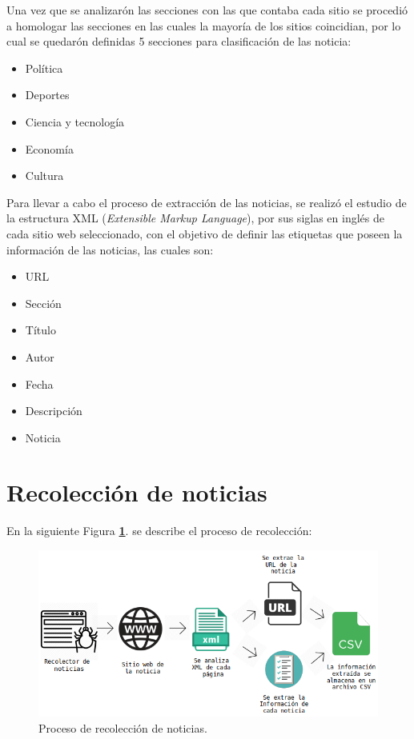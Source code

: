 Una vez que se analizarón las secciones con las que contaba cada sitio se procedió a homologar las secciones en las cuales la mayoría de los sitios coincidian, por lo cual se quedarón definidas 5 secciones para clasificación de las noticia:

\begin{itemize}
    \item Política
    \item Deportes
    \item Ciencia y tecnología
    \item Economía
    \item Cultura
\end{itemize}

Para llevar a cabo el proceso de extracción de las noticias, se realizó el estudio 
de la estructura XML (\textit{Extensible Markup Language}), por sus siglas en inglés de cada sitio web seleccionado, con 
el objetivo de definir las etiquetas que poseen la información de las noticias, las cuales son:

\begin{itemize}
  \item URL
  \item Sección
  \item Título
  \item Autor
  \item Fecha
  \item Descripción
  \item Noticia
\end{itemize} 

\section{Recolección de noticias}
En la siguiente Figura \textbf{\ref{fig:diagrama}}. se describe el proceso de recolección:

\begin{figure}[H]
  \centering
  \includegraphics[scale=.50]{imagenes/Capitulo5/diagrama}
  \caption{Proceso de recolección de noticias.}
  \label{fig:diagrama}
\end{figure}

